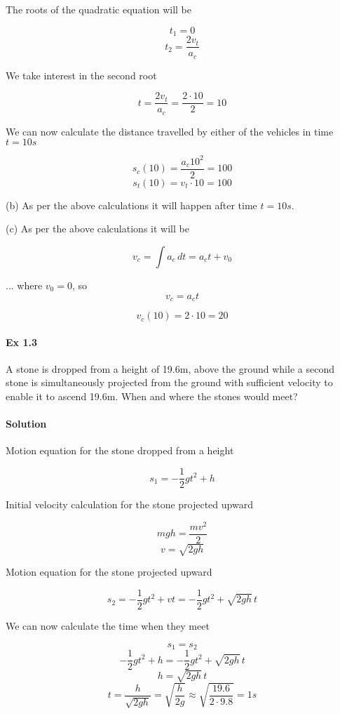 \documentclass{article}
\begin{document}
The roots of the quadratic equation will be

\[ t_1 = 0 \]
\[ t_2 = \frac{2v_t}{a_c} \]

We take interest in the second root

\[ t = \frac{2v_t}{a_c} = \frac{2 \cdot 10}{2} = 10 \]

We can now calculate the distance travelled by either of the vehicles in time $t = 10s$

\[ s_c(10) = \frac{a_c 10^2}{2}= 100 \]
\[ s_t(10) = v_t \cdot 10 = 100 \]

(b) As per the above calculations it will happen after time $t = 10s$.

(c) As per the above calculations it will be

\[ v_c = \int a_c \, dt = a_ct + v_0 \]

... where $v_0 = 0$, so
\[ v_c = a_ct \]

\[ v_c(10) = 2 \cdot 10 = 20 \]


\paragraph{Ex 1.3}
A stone is dropped from a height of 19.6m, above the ground while a second stone is simultaneously projected from the ground with sufficient velocity to enable it to ascend 19.6m. When and where the stones would meet?
\paragraph{Solution}

Motion equation for the stone dropped from a height

\[ s_1 = -\frac{1}{2}gt^2 + h \]

Initial velocity calculation for the stone projected upward

\[ mgh = \frac{mv^2}{2} \]
\[ v = \sqrt{2gh} \]

Motion equation for the stone projected upward

\[ s_2 = -\frac{1}{2}gt^2 + vt = -\frac{1}{2}gt^2 + \sqrt{2gh} \, t \]

We can now calculate the time when they meet

\[ s_1 = s_2 \]
\[ -\frac{1}{2}gt^2 + h = -\frac{1}{2}gt^2 + \sqrt{2gh} \, t \]
\[ h = \sqrt{2gh} \, t \]
\[ t = \frac{h}{\sqrt{2gh}} = \sqrt{\frac{h}{2g}} \approx \sqrt{\frac{19.6}{2 \cdot 9.8}} = 1s \]
\end{document}
